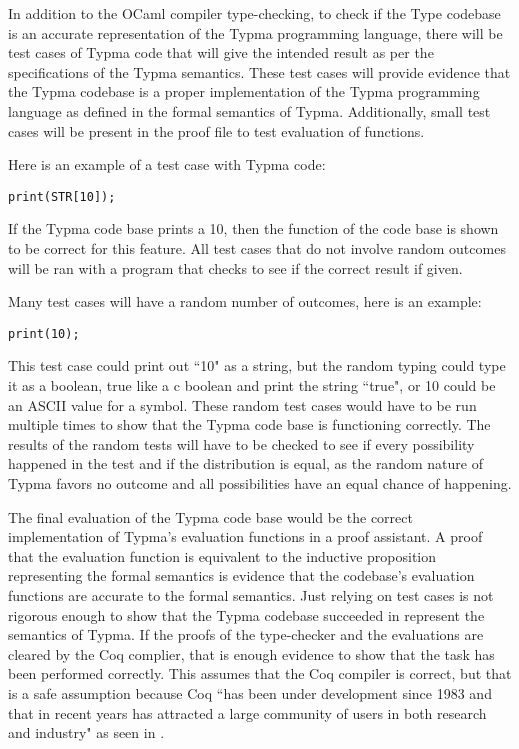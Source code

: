 \documentclass[10pt,twocolumn]{article}
\begin{document}
In addition to the OCaml compiler type-checking, to check if the Type codebase is an accurate representation of the Typma programming language, there will be test cases of Typma code that will give the intended result as per the specifications of the Typma semantics. These test cases will provide evidence that the Typma codebase is a proper implementation of the Typma programming language as defined in the formal semantics of Typma. Additionally, small test cases will be present in the proof file to test evaluation of functions.

Here is an example of a test case with Typma code:

\begin{lstlisting}
print(STR[10]);
\end{lstlisting}

If the Typma code base prints a 10, then the function of the code base is shown to be correct for this feature. All test cases that do not involve random outcomes will be ran with a program that checks to see if the correct result if given.

Many test cases will have a random number of outcomes, here is an example:

\begin{lstlisting}
print(10);
\end{lstlisting}

This test case could print out ``10" as a string, but the random typing could type it as a boolean, true like a c boolean and print the string ``true", or 10 could be an ASCII value for a symbol. These random test cases would have to be run multiple times to show that the Typma code base is functioning correctly. The results of the random tests will have to be checked to see if every possibility happened in the test and if the distribution is equal, as the random nature of Typma favors no outcome and all possibilities have an equal chance of happening.

The final evaluation of the Typma code base would be the correct implementation of Typma's evaluation functions in a proof assistant. A proof that the evaluation function is equivalent to the inductive proposition representing the formal semantics is evidence that the codebase's evaluation functions are accurate to the formal semantics. Just relying on test cases is not rigorous enough to show that the Typma codebase succeeded in represent the semantics of Typma. If the proofs of the type-checker and the evaluations are cleared by the Coq complier, that is enough evidence to show that the task has been performed correctly. This assumes that the Coq compiler is correct, but that is a safe assumption because Coq ``has been under development since 1983 and that in recent years has attracted a large community of users in both research and industry" as seen in \textcite{Pierce2021Software}.
\end{document}

